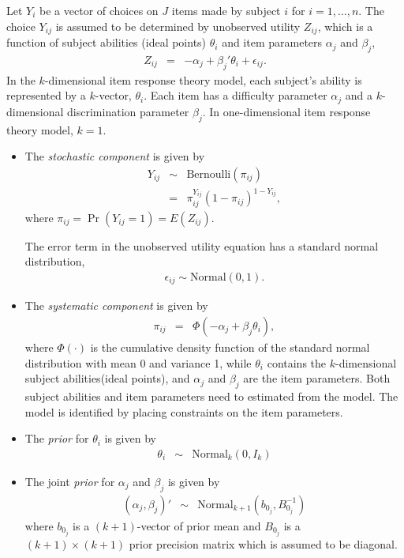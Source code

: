Let $Y_i$ be a vector of choices on $J$ items made by subject $i$ for 
$i = 1, \ldots, n$. The choice $Y_{ij}$ is assumed to be 
determined by unobserved utility $Z_{ij}$, which is a function
of subject abilities (ideal points) $\theta_i$ and item parameters
$\alpha_j$ and $\beta_j$,
\begin{eqnarray*}
Z_{ij} &=& -\alpha_j + \beta_j' \theta_i + \epsilon_{ij}.
\end{eqnarray*}
In the $k$-dimensional item response theory model, each subject's ability is 
represented by a $k$-vector, $\theta_i$. Each item has a difficulty 
parameter $\alpha_j$ and a $k$-dimensional discrimination parameter
$\beta_j$. In one-dimensional item response theory model, $k = 1$.

\begin{itemize}
\item The \emph{stochastic component} is given by
\begin{eqnarray*}
Y_{ij}  &  \sim & \textrm{Bernoulli}(\pi_{ij})\\
&  = & \pi_{ij}^{Y_{ij}}(1-\pi_{ij})^{1-Y_{ij}},
\end{eqnarray*}
where $\pi_{ij}=\Pr(Y_{ij}=1)=E(Z_{ij})$.

The error term in the unobserved utility equation has
a standard normal distribution,
\begin{eqnarray*}
\epsilon_{ij} \sim \textrm{Normal}(0, 1).
\end{eqnarray*}

\item The \emph{systematic component} is given by
\begin{eqnarray*}
\pi_{ij} &=& \Phi(-\alpha_j + \beta_j \theta_i),
\end{eqnarray*}
where $\Phi(\cdot)$ is the cumulative density function of the standard
normal distribution with mean 0 and variance 1, while $\theta_i$
contains the $k$-dimensional subject abilities(ideal points), and
$\alpha_{j}$ and $\beta_j$ are the item parameters. Both subject
abilities and item parameters need to estimated from the model. The
model is identified by placing constraints on the item parameters.

\item The \emph{prior} for $\theta_i$ is given by
\begin{eqnarray*}
\theta_i &\sim& \textrm{Normal}_k(0, I_k)
\end{eqnarray*}

\item The joint \emph{prior} for $\alpha_j$ and $\beta_j$ is given by
\begin{eqnarray*}
(\alpha_j, \beta_j)' &\sim& \textrm{Normal}_{k+1} \left( b_{0_j}, B_{0_j}^{-1}\right)
\end{eqnarray*}
where $b_{0_j}$ is a $(k+1)$-vector of prior mean and $B_{0_j}$ is a $(k+1) 
\times (k+1)$ prior precision matrix which is assumed to be diagonal.

\end{itemize}
 
